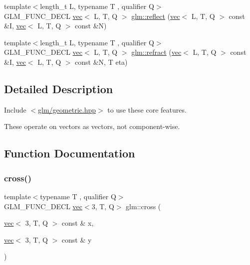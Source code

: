 \begin{DoxyCompactItemize}
\item 
{\footnotesize template$<$length\+\_\+t L, typename T , qualifier Q$>$ }\\G\+L\+M\+\_\+\+F\+U\+N\+C\+\_\+\+D\+E\+CL \hyperlink{structglm_1_1vec}{vec}$<$ L, T, Q $>$ \hyperlink{group__core__func__geometric_ga5631dd1d5618de5450b1ea3cf3e94905}{glm\+::reflect} (\hyperlink{structglm_1_1vec}{vec}$<$ L, T, Q $>$ const \&I, \hyperlink{structglm_1_1vec}{vec}$<$ L, T, Q $>$ const \&N)
\item 
{\footnotesize template$<$length\+\_\+t L, typename T , qualifier Q$>$ }\\G\+L\+M\+\_\+\+F\+U\+N\+C\+\_\+\+D\+E\+CL \hyperlink{structglm_1_1vec}{vec}$<$ L, T, Q $>$ \hyperlink{group__core__func__geometric_ga01da3dff9e2ef6b9d4915c3047e22b74}{glm\+::refract} (\hyperlink{structglm_1_1vec}{vec}$<$ L, T, Q $>$ const \&I, \hyperlink{structglm_1_1vec}{vec}$<$ L, T, Q $>$ const \&N, T eta)
\end{DoxyCompactItemize}


\subsection{Detailed Description}
Include $<$\hyperlink{geometric_8hpp}{glm/geometric.\+hpp}$>$ to use these core features.

These operate on vectors as vectors, not component-\/wise. 

\subsection{Function Documentation}
\mbox{\label{group__core__func__geometric_gaeeec0794212fe84fc9d261de067c9587}} 
\subsubsection{\texorpdfstring{cross()}{cross()}}
{\footnotesize\ttfamily template$<$typename T , qualifier Q$>$ \\
G\+L\+M\+\_\+\+F\+U\+N\+C\+\_\+\+D\+E\+CL \hyperlink{structglm_1_1vec}{vec}$<$3, T, Q$>$ glm\+::cross (\begin{DoxyParamCaption}\item[{\hyperlink{structglm_1_1vec}{vec}$<$ 3, T, Q $>$ const \&}]{x,  }\item[{\hyperlink{structglm_1_1vec}{vec}$<$ 3, T, Q $>$ const \&}]{y }\end{DoxyParamCaption})}




